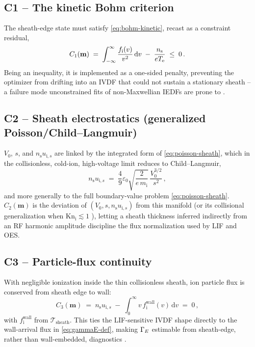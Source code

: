 \subsection{C1 -- The kinetic Bohm criterion}

The sheath-edge state must satisfy \cref{eq:bohm-kinetic}, recast as a constraint residual,
\begin{equation}
C_{1}(\mathbf m) \;=\; \int_{-\infty}^{\infty}\frac{f_{\mathrm i}(v)}{v^{2}}\,\mathrm dv \;-\; \frac{n_{\mathrm s}}{eT_{\mathrm{e}}} \;\le\; 0 \, . \label{eq:C1}
\end{equation}
Being an inequality, it is implemented as a one-sided penalty, preventing the optimizer from drifting into an IVDF that could not sustain a stationary sheath -- a failure mode unconstrained fits of non-Maxwellian IEDFs are prone to \cite{ref0090,ref0096}.

\subsection{C2 -- Sheath electrostatics (generalized Poisson/Child--Langmuir)}

$V_{0}$, $s$, and $n_{\mathrm s}u_{\mathrm i,s}$ are linked by the integrated form of \cref{eq:poisson-sheath}, which in the collisionless, cold-ion, high-voltage limit reduces to Child--Langmuir,
\begin{equation}
n_{\mathrm s}u_{\mathrm i,s} \;=\; \frac{4}{9}\varepsilon_{0}\sqrt{\frac{2}{e\,m_{\mathrm i}}}\,\frac{V_{0}^{3/2}}{s^{2}} \, , \label{ch15-eq:child-langmuir}
\end{equation}
and more generally to the full boundary-value problem \cref{eq:poisson-sheath}. $C_{2}(\mathbf m)$ is the deviation of $(V_{0},s,n_{\mathrm s}u_{\mathrm i,s})$ from this manifold (or its collisional generalization when $\mathrm{Kn}_{\mathrm i}\lesssim 1$ \cite{ref0077}), letting a sheath thickness inferred indirectly from an RF harmonic amplitude \cite{ref0043} discipline the flux normalization used by LIF and OES.

\subsection{C3 -- Particle-flux continuity}

With negligible ionization inside the thin collisionless sheath, ion particle flux is conserved from sheath edge to wall:
\begin{equation}
C_{3}(\mathbf m) \;=\; n_{\mathrm s}u_{\mathrm i,s} \;-\; \int_{0}^{\infty} v\, f_{\mathrm i}^{\mathrm{wall}}(v)\,\mathrm dv \;=\; 0 \, , \label{eq:C3}
\end{equation}
with $f_{\mathrm i}^{\mathrm{wall}}$ from $\mathcal T_{\mathrm{sheath}}$. This ties the LIF-sensitive IVDF shape directly to the wall-arrival flux in \cref{eq:gammaE-def}, making $\Gamma_{E}$ estimable from sheath-edge, rather than wall-embedded, diagnostics \cite{ref0119}.

